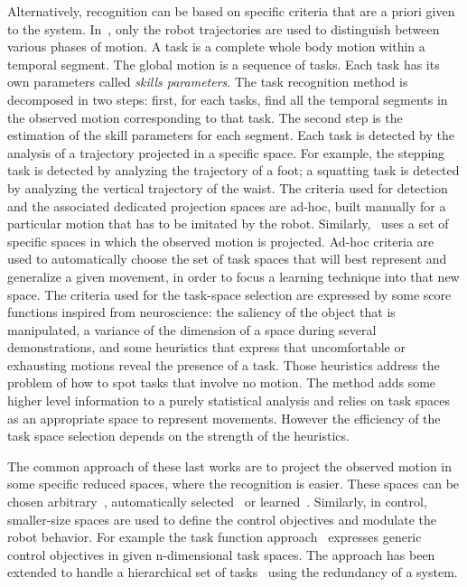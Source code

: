 \documentclass[journal]{IEEEtran}
\begin{document}
Alternatively, recognition can be based on specific criteria that are a priori given 
to the system. In~\cite{nakaoka07}, only the robot trajectories
are used to distinguish between various phases of motion. A task is
a complete whole body motion within a temporal segment. The global motion
is a sequence of tasks. Each task has its own
parameters called \emph{skills parameters}. The task recognition method is decomposed in two steps: 
first, for each tasks, find all the temporal segments in the observed motion
corresponding to that task.
The second step is the estimation of the skill parameters for each segment.
Each task is detected by the analysis of a trajectory projected in a specific space.
For example, the stepping task is detected by analyzing the trajectory 
of a foot; a squatting task is detected by analyzing the vertical trajectory of the waist.
The criteria used for detection and the associated dedicated projection spaces
are ad-hoc, built manually for a particular motion that has to be imitated by the robot.
Similarly,~\cite{muhlig09} uses a set of specific spaces
in which the observed motion is projected. Ad-hoc criteria
are used to automatically choose the set of task spaces that will best 
represent and generalize a given movement, in order to focus
a learning technique into that new space. The criteria used for the task-space selection
are expressed by some score functions inspired from neuroscience:
the saliency of the object that is manipulated, a variance of the dimension
of a space during several demonstrations, and some heuristics that express that
uncomfortable or exhausting motions reveal the presence of a task. Those heuristics
address the problem of how to spot tasks that involve no motion. The method
adds some higher level information to a purely statistical analysis and relies
on task spaces as an appropriate space to represent movements. However
the efficiency of the task space selection depends on the strength
of the heuristics.

The common approach of these last works are to project the observed motion in some specific reduced spaces,
where the recognition is easier. These spaces can be chosen arbitrary~\cite{nakaoka07}, 
automatically selected~\cite{muhlig09} or learned~\cite{peters08}. Similarly, in control,
smaller-size spaces are used to define the control objectives and modulate the robot behavior.
For example the task function approach~\cite{samson91} expresses generic control objectives in
given n-dimensional task spaces.
The approach has been extended to handle a hierarchical set of tasks~\cite{siciliano91, nakamura87}
using the redundancy of a system.
\medskip
\end{document}
